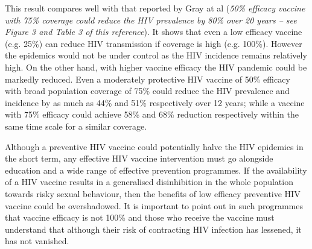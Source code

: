 This result compares well with that reported by Gray at al \cite{Gray2003} (\emph{50\%
efficacy vaccine with 75\% coverage could reduce the HIV prevalence by 80\% over 20 years
-- see Figure 3 and Table 3 of this reference}). It shows that even a low efficacy
vaccine (e.g. 25\%) can reduce HIV transmission if coverage is high (e.g. 100\%). However
the epidemics would not be under control as the HIV incidence remains relatively high. On
the other hand, with higher vaccine efficacy the HIV pandemic could be markedly reduced.
Even a moderately protective HIV vaccine of 50\% efficacy with broad population coverage
of 75\% could reduce the HIV prevalence and incidence by as much as 44\% and 51\%
respectively over 12 years; while a vaccine with 75\% efficacy could achieve 58\% and
68\% reduction respectively within the same time scale for a similar coverage.

Although a preventive HIV vaccine could potentially halve the HIV epidemics in the short
term, any effective HIV vaccine intervention must go alongside education and a wide range
of effective prevention programmes. If the availability of a HIV vaccine results in a
generalised disinhibition in the whole population towards risky sexual behaviour, then the
benefits of low efficacy preventive HIV vaccine could be overshadowed. It is important to
point out in such programmes that vaccine efficacy is not 100\% and those who receive the
vaccine must understand that although their risk of contracting HIV infection has
lessened, it has not vanished.
